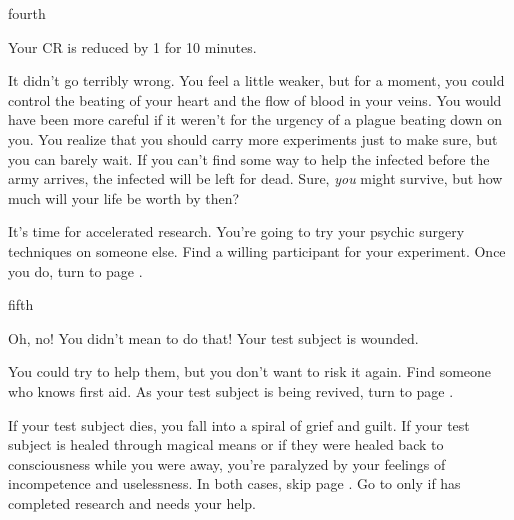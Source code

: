 \documentclass[greennotebook]{Pestilence} %
\begin{document}
\begin{page}{fourth}

Your CR is reduced by 1 for 10 minutes.

It didn't go terribly wrong. You feel a little weaker, but for a moment, you could control the beating of your heart and the flow of blood in your veins. You would have been more careful if it weren't for the urgency of a plague beating down on you. You realize that you should carry more experiments just to make sure, but you can barely wait. If you can't find some way to help the infected before the army arrives, the infected will be left for dead. Sure, \textit{you} might survive, but how much will your life be worth by then?

It's time for accelerated research. You're going to try your psychic surgery techniques on someone else. Find a willing participant for your experiment. Once you do, turn to page .

\end{page}

\begin{page}{fifth}

Oh, no! You didn't mean to do that! Your test subject is wounded.

You could try to help them, but you don't want to risk it again. Find someone who knows first aid. As your test subject is being revived, turn to page .

If your test subject dies, you fall into a spiral of grief and guilt. If your test subject is healed through magical means or if they were healed back to consciousness while you were away, you're paralyzed by your feelings of incompetence and uselessness. In both cases, skip page . Go to  only if \cOutsider{} has completed \cOutsider{\their} research and needs your help.

\end{page}
\end{document}
